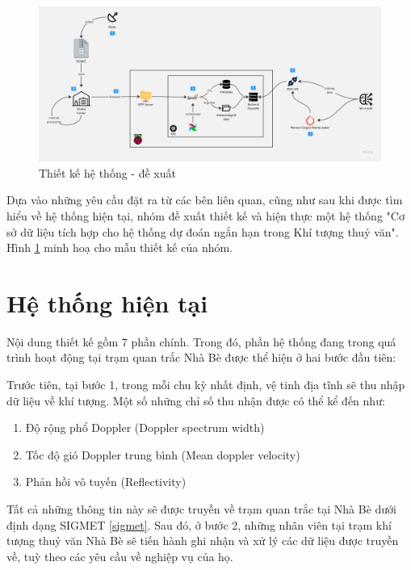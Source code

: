 \begin{figure}[H]
    \centering
    \includegraphics[width=1.05\linewidth]{Images/4.1-architecture.jpg}
    \vspace{1em}
    \caption{Thiết kế hệ thống - đề xuất}
    \label{fig:sow}
\end{figure}
\vspace{0.5cm}
Dựa vào những yêu cầu đặt ra từ các bên liên quan, cũng như sau khi được tìm hiểu về hệ thống hiện tại, nhóm đề xuất thiết kế và hiện thực một hệ thống "Cơ sở dữ liệu tích hợp cho hệ thống dự đoán ngắn hạn trong Khí tượng thuỷ văn". Hình \ref{fig:sow} minh hoạ cho mẫu thiết kế của nhóm.
\newpage
\section{Hệ thống hiện tại}
Nội dung thiết kế gồm 7 phần chính. Trong đó, phần hệ thống đang trong quá trình hoạt động tại trạm quan trắc Nhà Bè được thể hiện ở hai bước đầu tiên:

Trước tiên, tại bước 1, trong mỗi chu kỳ nhất định, vệ tinh địa tĩnh sẽ thu nhập dữ liệu về khí tượng. Một số những chỉ số thu nhận được có thể kể đến như:
\begin{enumerate}
    \item Độ rộng phổ Doppler (Doppler spectrum width)
    \item Tốc độ gió Doppler trung bình (Mean doppler velocity)
    \item Phản hồi vô tuyến (Reflectivity)
\end{enumerate}

Tất cả những thông tin này sẽ được truyền về trạm quan trắc tại Nhà Bè dưới định dạng SIGMET \ref{sigmet}. Sau đó, ở bước 2, những nhân viên tại trạm khí tượng thuỷ văn Nhà Bè sẽ tiến hành ghi nhận và xử lý các dữ liệu được truyền về, tuỳ theo các yêu cầu về nghiệp vụ của họ.


